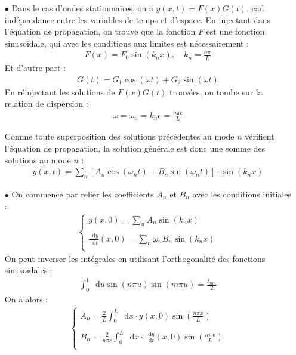 \documentclass{report}
\newcommand*\dif{\mathop{}\!\mathrm{d}}
\begin{document}
\begin{itemize}
\item[$\bullet$] Dans le cas d'ondes stationnaires, on a $y(x,t)=F(x)G(t)$, cad indépendance entre les variables de temps et d'espace. En injectant dans l'équation de propagation, on trouve que la fonction $F$ est une fonction sinusoïdale, qui avec les conditions aux limites est nécessairement :
	\begin{align*}
		F(x)=F_0\sin(k_n x),\quad k_n=\frac{n\pi}{L}
	\end{align*}
	Et d'autre part :	
	\begin{align*}
		G(t)=G_1\cos(\omega t)+G_2\sin(\omega t)
	\end{align*}	
En réinjectant les solutions de $F(x)G(t)$ trouvées, on tombe sur la relation de dispersion :
	\begin{align*}
		\omega=\omega_n=k_nc=\frac{n\pi c}{L}
	\end{align*}	
	
	Comme toute superposition des solutions précédentes au mode $n$ vérifient l'équation de propagation, la solution générale est donc une somme des solutions au mode $n$ :
	\begin{align*}
		y(x,t)=\sum_n \left[A_n\cos(\omega_nt) + B_n\sin(\omega_nt)\right] \cdot\sin(k_nx)
	\end{align*}

\item[$\bullet$] On commence par relier les coefficients $A_n$ et $B_n$ avec les conditions initiales :
	\begin{align*}
	\left\lbrace
	\begin{array}{ccc}
	y(x,0)=\sum_n A_n\sin(k_nx)\\
	\\
	\frac{\dif y}{\dif t}(x,0)=\sum_n \omega_n B_n\sin(k_nx)\\
	\end{array}\right.
	\end{align*}		
	On peut inverser les intégrales en utilisant l'orthogonalité des fonctions sinusoïdales :
	\begin{align*}
	\int_0^1\dif u\sin(n\pi u)\sin(m\pi u)=\frac{\delta_{nm}}{2}
	\end{align*}			
On a alors :
	\begin{align*}
	\left\lbrace
	\begin{array}{ccc}
	A_n=\frac{2}{L}\int_0^L\dif x\cdot y(x,0)\sin\left(\frac{n\pi x}{L} \right) \\
	\\
	B_n=\frac{2}{n\pi c}\int_0^L\dif x\cdot \frac{\dif y}{\dif t}(x,0)\sin\left(\frac{n\pi x}{L} \right)\\
	\end{array}\right.
	\end{align*}		
	

\end{itemize}
\end{document}
